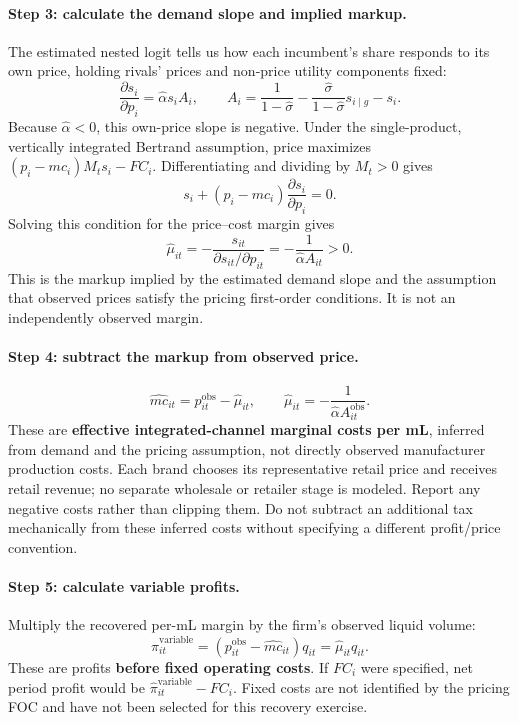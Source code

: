 \documentclass[11pt]{article}
\begin{document}
\paragraph{Step 3: calculate the demand slope and implied markup.}
The estimated nested logit tells us how each incumbent's share responds to its own price, holding rivals' prices and non-price utility components fixed:
\[
\frac{\partial s_i}{\partial p_i}=\widehat\alpha s_i A_i,\qquad
A_i=\frac{1}{1-\widehat\sigma}-\frac{\widehat\sigma}{1-\widehat\sigma}s_{i\mid g}-s_i.
\]
Because $\widehat\alpha<0$, this own-price slope is negative. Under the single-product, vertically integrated Bertrand assumption, price maximizes $(p_i-mc_i)M_ts_i-FC_i$. Differentiating and dividing by $M_t>0$ gives
\[
s_i+(p_i-mc_i)\frac{\partial s_i}{\partial p_i}=0.
\]
Solving this condition for the price--cost margin gives
\[
\widehat\mu_{it}=-\frac{s_{it}}{\partial s_{it}/\partial p_{it}}
=-\frac{1}{\widehat\alpha A_{it}}>0.
\]
This is the markup implied by the estimated demand slope and the assumption that observed prices satisfy the pricing first-order conditions. It is not an independently observed margin.

\paragraph{Step 4: subtract the markup from observed price.}
\begin{equation}\label{eq:recovercost}
\widehat{mc}_{it}=p_{it}^{\mathrm{obs}}-\widehat\mu_{it},\qquad
\widehat\mu_{it}=-\frac{1}{\widehat\alpha A_{it}^{\mathrm{obs}}}.
\end{equation}
These are \textbf{effective integrated-channel marginal costs per mL}, inferred from demand and the pricing assumption, not directly observed manufacturer production costs. Each brand chooses its representative retail price and receives retail revenue; no separate wholesale or retailer stage is modeled. Report any negative costs rather than clipping them. Do not subtract an additional tax mechanically from these inferred costs without specifying a different profit/price convention.

\paragraph{Step 5: calculate variable profits.}
Multiply the recovered per-mL margin by the firm's observed liquid volume:
\[
\widehat\pi_{it}^{\mathrm{variable}}
=(p_{it}^{\mathrm{obs}}-\widehat{mc}_{it})q_{it}
=\widehat\mu_{it}q_{it}.
\]
These are profits \textbf{before fixed operating costs}. If $FC_i$ were specified, net period profit would be $\widehat\pi_{it}^{\mathrm{variable}}-FC_i$. Fixed costs are not identified by the pricing FOC and have not been selected for this recovery exercise.
\end{document}
